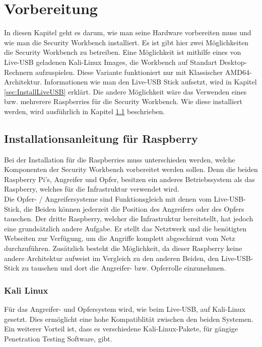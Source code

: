 \chapter{Vorbereitung}
\label{ch:startWorkbench}
In diesen Kapitel geht es darum, wie man seine Hardware vorbereiten muss und wie man die Security Workbench installiert. Es ist gibt hier zwei Möglichkeiten die Security Workbench zu betreiben. Eine Möglichkeit ist mithilfe eines von Live-USB geladenen Kali-Linux Images, die Workbench auf Standart Desktop-Rechnern aufzuspielen. Diese Variante funktioniert nur mit Klassischer AMD64-Architektur. Informationen wie man den Live-USB Stick aufsetzt, wird in Kapitel \ref{sec:InstallLiveUSB} erklärt. Die andere Möglichkeit wäre das Verwenden eines bzw. mehrerere Raspberries für die Security Workbench. Wie diese installiert werden, wird ausführlich in Kapitel \ref{sec:RaspberryInstall} beschrieben.
\section{Installationsanleitung für Raspberry}
\label{sec:RaspberryInstall}
Bei der Installation für die Raspberries muss unterschieden werden, welche Komponenten der Security Workbench vorbereitet werden sollen. Denn die beiden Raspberry Pi's, Angreifer und Opfer, besitzen ein anderes Betriebssystem als das Raspberry, welches für die Infrastruktur verwendet wird.\\
Die Opfer- / Angreifersysteme sind Funktionsgleich mit denen vom Live-USB-Stick, die Beiden können jederzeit die Position des Angreifers oder des Opfers tauschen. Der dritte Raspberry, welcher die Infrastruktur bereitstellt, hat jedoch eine grundsätzlich andere Aufgabe. Er stellt das Netztwerk und die benötigten Webseiten zur Verfügung, um die Angriffe komplett abgeschirmt vom Netz durchzuführen. Zusätzlich besteht die Möglichkeit, da dieser Raspberry keine andere Architektur aufweist im Vergleich zu den anderen Beiden, den Live-USB-Stick zu tauschen und dort die Angreifer- bzw. Opferrolle einzunehmen.
\subsection{Kali Linux}
Für das Angreifer- und Opfersystem wird, wie beim Live-USB, auf Kali-Linux gesetzt. Dies ermöglicht eine hohe Kompatiblität zwischen den beiden Systemen. Ein weiterer Vorteil ist, dass es verschiedene Kali-Linux-Pakete, für gängige Penetration Testing Software, gibt.
\label{subsec:installRPIKali}
